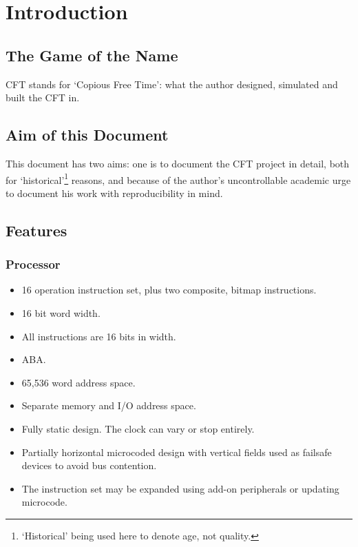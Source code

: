 \chapter{Introduction}

\section{The Game of the Name}

CFT stands for ‘Copious Free Time’: what the author designed, simulated and
built the CFT in.

\section{Aim of this Document}

This document has two aims: one is to document the CFT project in detail, both
for ‘historical’\footnote{‘Historical’ being used here to denote age, not
  quality.} reasons, and because of the author's uncontrollable academic urge
to document his work with reproducibility in mind.

\section{Features}

\subsection{Processor}

\begin{itemize}
\item 16 operation instruction set, plus two composite, bitmap
  instructions.
\item 16 bit word width.
\item All instructions are 16 bits in width.
\item \gls{ABA}.
\item 65,536 word address space.
\item Separate memory and I/O address space.
\item Fully static design. The clock can vary or stop entirely.
\item Partially horizontal microcoded design with vertical fields used
  as failsafe devices to avoid bus contention.
\item The instruction set may be expanded using add-on peripherals or updating microcode.
\end{itemize}

